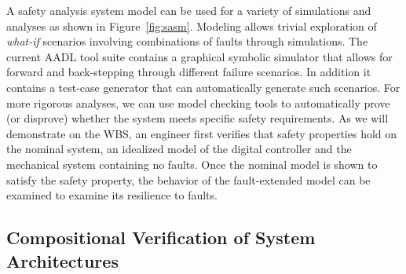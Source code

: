 

A safety analysis system model can be used for a variety of simulations and analyses as shown in Figure~\ref{fig:sasm}.  Modeling allows trivial exploration of \textit{what-if} scenarios involving combinations of faults through simulations.  The current AADL tool suite contains a graphical symbolic simulator that allows for forward and back-stepping through different failure scenarios.  In addition it contains a test-case generator that can automatically generate such scenarios.
For more rigorous analyses, we can use model checking tools to automatically prove (or disprove) whether the system meets specific safety requirements.  As we will demonstrate on the WBS, an engineer first verifies that safety properties hold on the nominal system, an idealized model of the digital controller and the mechanical system containing no faults.  Once the nominal model is shown to satisfy the safety property, the behavior of the fault-extended model can be examined to examine its resilience to faults.




\iffalse
\subsection{Compositional Verification of System Architectures}

